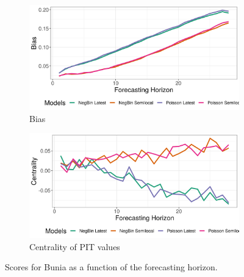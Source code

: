\begin{figure}[H]
\begin{subfigure}{0.5\textwidth}
  \centering
  \includegraphics[width=\linewidth]{../output/Bunia_bias.png}  
  \caption{Bias}
  \label{fig:Bunia_scores_3}
\end{subfigure}
\begin{subfigure}{0.5\textwidth}
  \centering
  \includegraphics[width=\linewidth]{../output/Bunia_centrality.png}  
  \caption{Centrality of PIT values}
  \label{fig:Bunia_scores_4}
\end{subfigure}
  \caption{Scores for Bunia as a function of the forecasting horizon.}

  \label{fig:nat_scores}
\end{figure}
